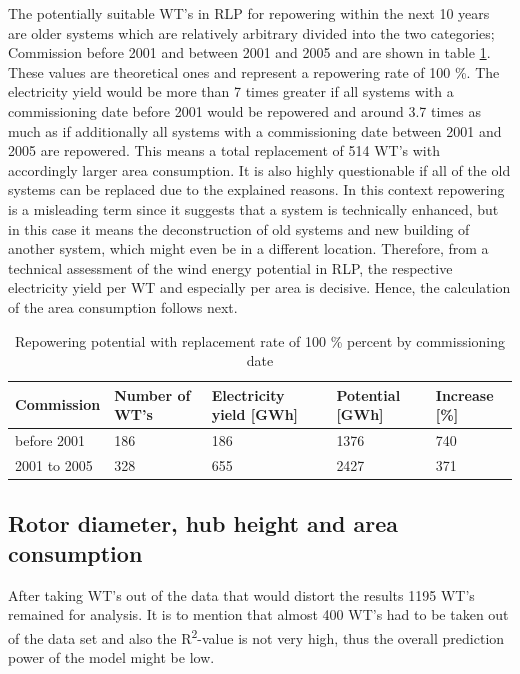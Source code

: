 \documentclass[a4paper,11pt]{article}
\begin{document}
The potentially suitable WT's in RLP for repowering within the next 10 years are older systems which are relatively arbitrary divided into the two categories; Commission before 2001 and between 2001 and 2005 and are shown in table \ref{tab:table1}. These values are theoretical ones and represent a repowering rate of 100 \%. The electricity yield would be more than 7 times greater if all systems with a commissioning date before 2001 would be repowered and around 3.7 times as much as if additionally all systems with a commissioning date between 2001 and 2005 are repowered. This means a total replacement of 514 WT's with accordingly larger area consumption. It is also highly questionable if all of the old systems can be replaced due to the explained reasons. In this context repowering is a misleading term since it suggests that a system is technically enhanced, but in this case it means the deconstruction of old systems and new building of another system, which might even be in a different location. Therefore, from a technical assessment of the wind energy potential in RLP, the respective electricity yield per WT and especially per area is decisive. Hence, the calculation of the area consumption follows next.
\begin{table}[H]

\caption{\label{tab:table1}Repowering potential with replacement rate of 100 \% percent by 
  commissioning date}
\centering
\begin{tabular}[t]{lllll}
\toprule
Commission & Number of WT's & Electricity yield [GWh] & Potential [GWh] & Increase [\%]\\
\midrule
before 2001 & 186 & 186 & 1376 & 740\\
2001 to 2005 & 328 & 655 & 2427 & 371\\
\midrule
\bottomrule
\end{tabular}
\end{table}
\hypertarget{rotor-diameter-hub-height-and-area-consumption}{%
\subsection{Rotor diameter, hub height and area consumption}\label{rotor-diameter-hub-height-and-area-consumption}}

After taking WT's out of the data that would distort the results 1195 WT's remained for analysis. It is to mention that almost 400 WT's had to be taken out of the data set and also the R\textsuperscript{2}-value is not very high, thus the overall prediction power of the model might be low.
\end{document}
